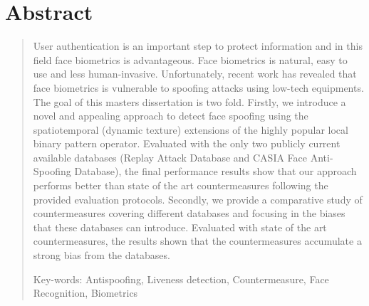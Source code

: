 \chapter*{Abstract}

\begin{quotation}

\noindent 

User authentication is an important step to protect information and in this field face biometrics is advantageous. Face biometrics is natural, easy to use and less human-invasive. Unfortunately, recent work has revealed that face biometrics is vulnerable to spoofing attacks using low-tech equipments. The goal of this masters dissertation is two fold. Firstly, we introduce a novel and appealing approach to detect face spoofing using the spatiotemporal (dynamic texture) extensions of the highly popular local binary pattern operator. Evaluated with the only two publicly current available databases (Replay Attack Database and CASIA Face Anti-Spoofing Database), the final performance results show that our approach performs better than state of the art countermeasures following the provided evaluation protocols. Secondly, we provide a comparative study of countermeasures covering different databases and focusing in the biases that these databases can introduce. Evaluated with state of the art countermeasures, the results shown that the countermeasures accumulate a strong bias from the databases. 

\vspace*{0.5cm}

\noindent Key-words:  Antispoofing, Liveness detection, Countermeasure, Face Recognition, Biometrics
\newpage%
\end{quotation}

\newpage
\null

